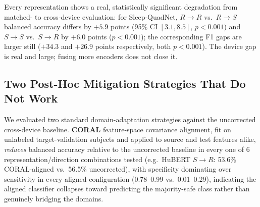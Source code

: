 \documentclass[conference]{IEEEtran}
\begin{document}
Every representation shows a real, statistically significant degradation from matched- to cross-device evaluation: for Sleep-QuadNet, $R\!\to\!R$ vs.\ $R\!\to\!S$ balanced accuracy differs by $+5.9$ points (95\% CI $[3.1,8.5]$, $p<0.001$) and $S\!\to\!S$ vs.\ $S\!\to\!R$ by $+6.0$ points ($p<0.001$); the corresponding F1 gaps are larger still ($+34.3$ and $+26.9$ points respectively, both $p<0.001$). The device gap is real and large; fusing more encoders does not close it.

\subsection{Two Post-Hoc Mitigation Strategies That Do Not Work}

We evaluated two standard domain-adaptation strategies against the uncorrected cross-device baseline. \textbf{CORAL} feature-space covariance alignment, fit on unlabeled target-validation subjects and applied to source and test features alike, \emph{reduces} balanced accuracy relative to the uncorrected baseline in every one of 6 representation/direction combinations tested (e.g.\ HuBERT $S\!\to\!R$: 53.6\% CORAL-aligned vs.\ 56.5\% uncorrected), with specificity dominating over sensitivity in every aligned configuration (0.78--0.99 vs.\ 0.01--0.29), indicating the aligned classifier collapses toward predicting the majority-safe class rather than genuinely bridging the domains.
\end{document}
